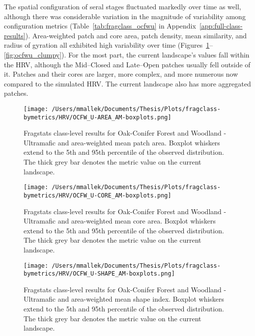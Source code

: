 The spatial configuration of seral stages fluctuated markedly over time as well, although there was considerable variation in the magnitude of variability among configuration metrics (Table~\ref{tab:fragclass_ocfwu} in Appendix~\ref{app:full-class-results}). Area-weighted patch and core area, patch density, mean similarity, and radius of gyration all exhibited high variability over time (Figures~\ref{fig:ocfwu_areaam}--\ref{fig:ocfwu_clumpy}). For the most part, the current landscape's values fall within the HRV, although the Mid--Closed and Late--Open patches usually fell outside of it. Patches and their cores are larger, more complex, and more numerous now compared to the simulated HRV. The current landscape also has more aggregated patches. 

\begin{figure}[!htbp]
\centering
    \texttt{[image: /Users/mmallek/Documents/Thesis/Plots/fragclass-bymetrics/HRV/OCFW\_U-AREA\_AM-boxplots.png]}
  \caption{Fragstats class-level results for Oak-Conifer Forest and Woodland - Ultramafic and area-weighted mean patch area. Boxplot whiskers extend to the 5th and 95th percentile of the observed distribution. The thick grey bar denotes the metric value on the current landscape.}
  \label{fig:ocfwu_areaam}
\end{figure}


\begin{figure}[!htbp]
\centering
    \texttt{[image: /Users/mmallek/Documents/Thesis/Plots/fragclass-bymetrics/HRV/OCFW\_U-CORE\_AM-boxplots.png]}
  \caption{Fragstats class-level results for Oak-Conifer Forest and Woodland - Ultramafic and area-weighted mean core area. Boxplot whiskers extend to the 5th and 95th percentile of the observed distribution. The thick grey bar denotes the metric value on the current landscape.}
  \label{fig:ocfwu_coream}
\end{figure}


\begin{figure}[!htbp]
\centering
    \texttt{[image: /Users/mmallek/Documents/Thesis/Plots/fragclass-bymetrics/HRV/OCFW\_U-SHAPE\_AM-boxplots.png]}
  \caption{Fragstats class-level results for Oak-Conifer Forest and Woodland - Ultramafic and area-weighted mean shape index. Boxplot whiskers extend to the 5th and 95th percentile of the observed distribution. The thick grey bar denotes the metric value on the current landscape.}
  \label{fig:ocfwu_shapeam}
\end{figure}


